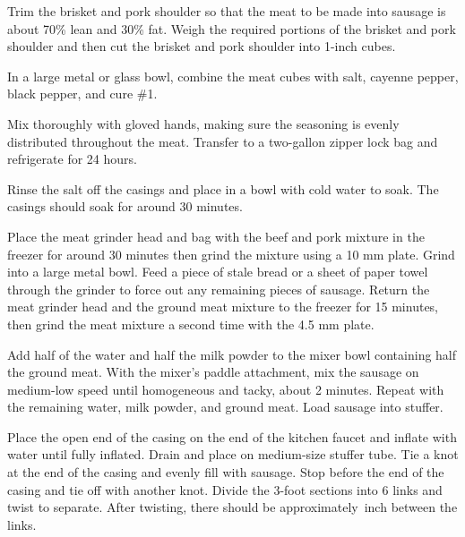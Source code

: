 \documentclass[letterpaper]{recipePMG}
\newcommand{\threequarters}{\nicefrac{3}{4} \,}
\begin{document}




Trim the brisket and pork shoulder so that the meat to be made into sausage is about 70\% lean and 30\% fat. Weigh the required portions of the brisket and pork shoulder and then cut the brisket and pork shoulder into 1-inch cubes. 

In a large metal or glass bowl, combine the meat cubes with salt, cayenne pepper, black pepper, and cure \#1.

Mix thoroughly with gloved hands, making sure the seasoning is evenly distributed throughout the meat. Transfer to a two-gallon zipper lock bag and refrigerate for 24 hours.

Rinse the salt off the casings and place in a bowl with cold water to soak.  The casings should soak for around 30 minutes.

Place the meat grinder head and bag with the beef and pork mixture in the freezer for around 30 minutes then grind the mixture using a 10 mm plate. Grind into a large metal bowl. Feed a piece of stale bread or a sheet of paper towel through the grinder to force out any remaining pieces of sausage. Return the meat grinder head and the ground meat mixture to the freezer for 15 minutes, then grind the meat mixture a second time with the 4.5 mm plate.

Add half of the water and half the milk powder to the mixer bowl containing half the ground meat. With the mixer's paddle attachment, mix the sausage on medium-low speed until homogeneous and tacky, about 2 minutes. Repeat with the remaining water, milk powder, and ground meat. Load sausage into stuffer. 

Place the open end of the casing on the end of the kitchen faucet and inflate with water until fully inflated. Drain and place on medium-size stuffer tube. Tie a knot at the end of the casing and evenly fill with sausage. Stop before the end of the casing and tie off with another knot.  Divide the 3-foot sections into 6 links and twist to separate. After twisting, there should be approximately \threequarters inch between the links. 
\end{document}
